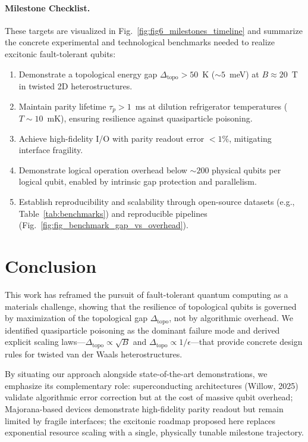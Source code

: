 \documentclass[aps,prl,twocolumn,superscriptaddress]{revtex4-2}
\begin{document}
\paragraph*{Milestone Checklist.}
These targets are visualized in Fig.~\ref{fig:fig6_milestones_timeline} and
summarize the concrete experimental and technological benchmarks needed to
realize excitonic fault-tolerant qubits:
\begin{enumerate}
    \item Demonstrate a topological energy gap $\Delta_{\text{topo}} > 50$~K ($\sim 5$~meV) at $B \approx 20$~T in twisted 2D heterostructures.
    \item Maintain parity lifetime $\tau_{p} > 1$~ms at dilution refrigerator temperatures ($T \sim 10$~mK), ensuring resilience against quasiparticle poisoning.
    \item Achieve high-fidelity I/O with parity readout error $< 1\%$, mitigating interface fragility.
    \item Demonstrate logical operation overhead below $\sim 200$ physical qubits per logical qubit, enabled by intrinsic gap protection and parallelism.
    \item Establish reproducibility and scalability through open-source datasets (e.g., Table~\ref{tab:benchmarks}) and reproducible pipelines (Fig.~\ref{fig:fig_benchmark_gap_vs_overhead}).
\end{enumerate}



\section{Conclusion}
This work has reframed the pursuit of fault-tolerant quantum computing as a materials challenge, showing that the resilience of topological qubits is governed by maximization of the topological gap $\Delta_{\text{topo}}$, not by algorithmic overhead. 
We identified quasiparticle poisoning as the dominant failure mode and derived explicit scaling laws---$\Delta_{\text{topo}} \propto \sqrt{B}$ and $\Delta_{\text{topo}} \propto 1/\epsilon$---that provide concrete design rules for twisted van der Waals heterostructures. 

By situating our approach alongside state-of-the-art demonstrations, we emphasize its complementary role: 
superconducting architectures (Willow, 2025) validate algorithmic error correction but at the cost of massive qubit overhead; 
Majorana-based devices demonstrate high-fidelity parity readout but remain limited by fragile interfaces; 
the excitonic roadmap proposed here replaces exponential resource scaling with a single, physically tunable milestone trajectory. 
\end{document}
